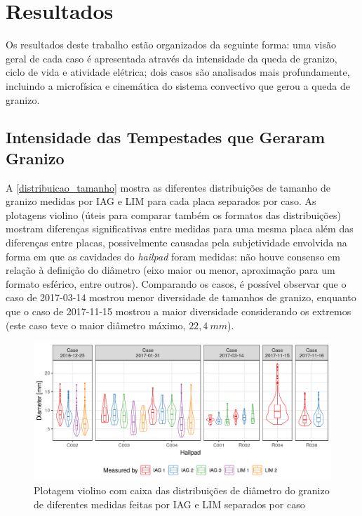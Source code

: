 \chapter{Resultados}\label{resultados}

Os resultados deste trabalho estão organizados da seguinte forma: uma visão geral de cada caso é apresentada através da intensidade da queda de granizo, ciclo de vida e atividade elétrica; dois casos são analisados mais profundamente, incluindo a microfísica e cinemática do sistema convectivo que gerou a queda de granizo.

\section{Intensidade das Tempestades que Geraram Granizo}\label{ciclo_vida}

A \autoref{distribuicao_tamanho} mostra as diferentes distribuições de tamanho de granizo medidas por IAG e LIM para cada placa separados por caso. As plotagens violino (úteis para comparar também os formatos das distribuições) mostram diferenças significativas entre medidas para uma mesma placa além das diferenças entre placas, possivelmente causadas pela subjetividade envolvida na forma em que as cavidades do \textit{hailpad} foram medidas: não houve consenso em relação à definição do diâmetro (eixo maior ou menor, aproximação para um formato esférico, entre outros). Comparando os casos, é possível observar que o caso de 2017-03-14 mostrou menor diversidade de tamanhos de granizo, enquanto que o caso de 2017-11-15 mostrou a maior diversidade considerando os extremos (este caso teve o maior diâmetro máximo, $22,4\:mm$).

\begin{figure}[hbt]
	\begin{center}
		\caption{Plotagem violino com caixa das distribuições de diâmetro do granizo de diferentes medidas feitas por IAG e LIM separados por caso} 
		\label{distribuicao_tamanho}
		\includegraphics[width=\columnwidth]{../Hailpads_Processing/figures/measures_distribution.png}
	\end{center}
\end{figure}

